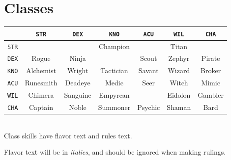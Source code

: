 \documentclass[12pt]{article}
\newcommand{\STR}{\texttt{STR}}
\newcommand{\DEX}{\texttt{DEX}}
\newcommand{\KNO}{\texttt{KNO}}
\newcommand{\ACU}{\texttt{ACU}}
\newcommand{\WIL}{\texttt{WIL}}
\newcommand{\CHA}{\texttt{CHA}}
\begin{document}
\pagebreak
\section{Classes}

\begin{tabularx}{\textwidth}{c|CCCCCC}
& \STR & \DEX & \KNO & \ACU & \WIL & \CHA \\\hline
\STR &  &  & Champion &  & Titan &  \\
\DEX & Rogue & Ninja &  & Scout & Zephyr & Pirate \\
\KNO & Alchemist & Wright & Tactician & Savant & Wizard & Broker \\
\ACU & Runesmith & Deadeye & Medic & Seer & Witch & Mimic  \\
\WIL & Chimera & Sanguine & Empyrean &  & Eidolon & Gambler \\
\CHA & Captain & Noble & Summoner & Psychic & Shaman & Bard \\
\end{tabularx}
\\[5mm]
Class skills have flavor text and rules text.

Flavor text will be in \textit{italics}, and should be ignored when making rulings.
\end{document}

